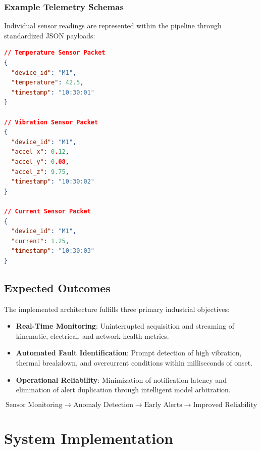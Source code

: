 \documentclass[12pt,a4paper]{report}
\begin{document}
\subsection{Example Telemetry Schemas}
Individual sensor readings are represented within the pipeline through standardized JSON payloads:

\begin{lstlisting}[language=json, caption={Sensor Data Packet Examples}]
// Temperature Sensor Packet
{
  "device_id": "M1",
  "temperature": 42.5,
  "timestamp": "10:30:01"
}

// Vibration Sensor Packet
{
  "device_id": "M1",
  "accel_x": 0.12,
  "accel_y": 0.08,
  "accel_z": 9.75,
  "timestamp": "10:30:02"
}

// Current Sensor Packet
{
  "device_id": "M1",
  "current": 1.25,
  "timestamp": "10:30:03"
}
\end{lstlisting}

\section{Expected Outcomes}
The implemented architecture fulfills three primary industrial objectives:
\begin{itemize}
    \item \textbf{Real-Time Monitoring}: Uninterrupted acquisition and streaming of kinematic, electrical, and network health metrics.
    \item \textbf{Automated Fault Identification}: Prompt detection of high vibration, thermal breakdown, and overcurrent conditions within milliseconds of onset.
    \item \textbf{Operational Reliability}: Minimization of notification latency and elimination of alert duplication through intelligent model arbitration.
\end{itemize}
\[
\text{Sensor Monitoring} \longrightarrow \text{Anomaly Detection} \longrightarrow \text{Early Alerts} \longrightarrow \text{Improved Reliability}
\]

\chapter{System Implementation}
\end{document}
